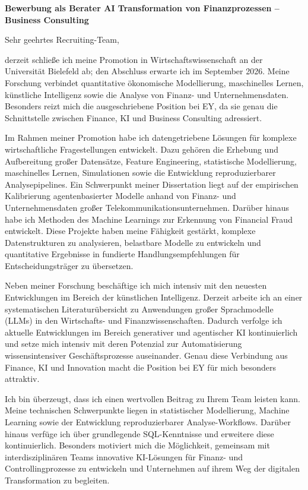 \documentclass[11pt]{article}
\begin{document}
\vspace{0.05cm}

\noindent
\textbf{Bewerbung als Berater AI Transformation von Finanzprozessen -- Business Consulting} 

\noindent Sehr geehrtes Recruiting-Team,

derzeit schlie\ss{}e ich meine Promotion in Wirtschaftswissenschaft an der Universität Bielefeld ab; den Abschluss erwarte ich im September 2026. Meine Forschung verbindet quantitative ökonomische Modellierung, maschinelles Lernen, künstliche Intelligenz sowie die Analyse von Finanz- und Unternehmensdaten. Besonders reizt mich die ausgeschriebene Position bei EY, da sie genau die Schnittstelle zwischen Finance, KI und Business Consulting adressiert. 

Im Rahmen meiner Promotion habe ich datengetriebene Lösungen für komplexe wirtschaftliche Fragestellungen entwickelt. Dazu gehören die Erhebung und Aufbereitung gro\ss{}er Datensätze, Feature Engineering, statistische Modellierung, maschinelles Lernen, Simulationen sowie die Entwicklung reproduzierbarer Analysepipelines. Ein Schwerpunkt meiner Dissertation liegt auf der empirischen Kalibrierung agentenbasierter Modelle anhand von Finanz- und Unternehmensdaten gro\ss{}er Telekommunikationsunternehmen. Darüber hinaus habe ich Methoden des Machine Learnings zur Erkennung von Financial Fraud entwickelt. Diese Projekte haben meine Fähigkeit gestärkt, komplexe Datenstrukturen zu analysieren, belastbare Modelle zu entwickeln und quantitative Ergebnisse in fundierte Handlungsempfehlungen für Entscheidungsträger zu übersetzen.

Neben meiner Forschung beschäftige ich mich intensiv mit den neuesten Entwicklungen im Bereich der künstlichen Intelligenz. Derzeit arbeite ich an einer systematischen Literaturübersicht zu Anwendungen gro\ss{}er Sprachmodelle (LLMs) in den Wirtschafts- und Finanzwissenschaften. Dadurch verfolge ich aktuelle Entwicklungen im Bereich generativer und agentischer KI kontinuierlich und setze mich intensiv mit deren Potenzial zur Automatisierung wissensintensiver Geschäftsprozesse auseinander. Genau diese Verbindung aus Finance, KI und Innovation macht die Position bei EY für mich besonders attraktiv.

Ich bin überzeugt, dass ich einen wertvollen Beitrag zu Ihrem Team leisten kann. Meine technischen Schwerpunkte liegen in statistischer Modellierung, Machine Learning sowie der Entwicklung reproduzierbarer Analyse-Workflows. Darüber hinaus verfüge ich über grundlegende SQL-Kenntnisse und erweitere diese kontinuierlich. Besonders motiviert mich die Möglichkeit, gemeinsam mit interdisziplinären Teams innovative KI-Lösungen für Finanz- und Controllingprozesse zu entwickeln und Unternehmen auf ihrem Weg der digitalen Transformation zu begleiten.
\end{document}
